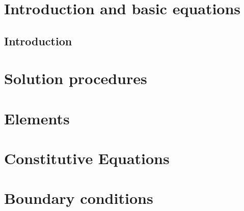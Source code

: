 \documentclass[a4paper]{book}
\begin{document}


\clearpage
\setcounter{page}{1}
\pagestyle{headings}

\tableofcontents
\chapter{Introduction and basic equations}
\section{Introduction}




\chapter{Solution procedures}

\chapter{Elements}
\chapter{Constitutive Equations}

\chapter{Boundary conditions}

{}



\end{document}
